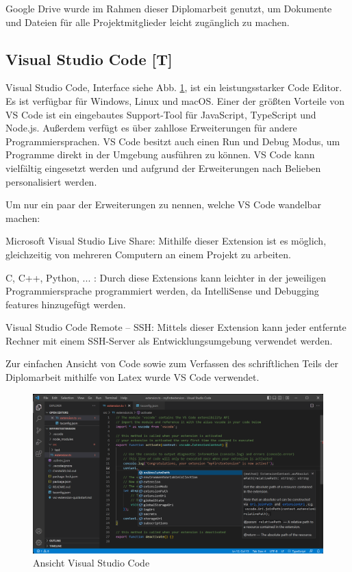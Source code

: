 Google Drive wurde im Rahmen dieser Diplomarbeit genutzt, um Dokumente und Dateien für alle Projektmitglieder leicht zugänglich zu machen.


\subsection{Visual Studio Code [T]} 
Visual Studio Code, Interface siehe Abb. \ref{fig:impl:vsCode}, ist ein leistungsstarker Code Editor. Es ist verfügbar für Windows, Linux und macOS.
Einer der größten Vorteile von VS Code ist ein eingebautes Support-Tool für JavaScript, TypeScript und Node.js. Außerdem verfügt es über zahllose Erweiterungen für andere Programmiersprachen. VS Code besitzt auch einen Run und Debug Modus, um Programme direkt in der Umgebung ausführen zu können.
VS Code kann vielfältig eingesetzt werden und aufgrund der Erweiterungen nach Belieben personalisiert werden. \cite{VSCodeOfficialSite}


Um nur ein paar der Erweiterungen zu nennen, welche VS Code wandelbar machen:


\begin{compactitem}
\item Microsoft Visual Studio Live Share: Mithilfe dieser Extension ist es möglich, gleichzeitig von mehreren Computern an einem Projekt zu arbeiten.
\item C, C++, Python, ... : Durch diese Extensions kann leichter in der jeweiligen Programmiersprache programmiert werden, da IntelliSense und Debugging features hinzugefügt werden.
\item Visual Studio Code Remote – SSH: Mittels dieser Extension kann jeder entfernte Rechner mit einem SSH-Server als Entwicklungsumgebung verwendet werden.
\end{compactitem}
\cite{VSCodeOfficialSite}


Zur einfachen Ansicht von Code sowie zum Verfassen des schriftlichen Teils der Diplomarbeit mithilfe von Latex wurde VS Code verwendet.


\begin{figure}[h t]
\centering
\includegraphics[scale=0.48]{pics/visualStudioCode.png}
\caption{Ansicht Visual Studio Code}
\label{fig:impl:vsCode}
\end{figure}


